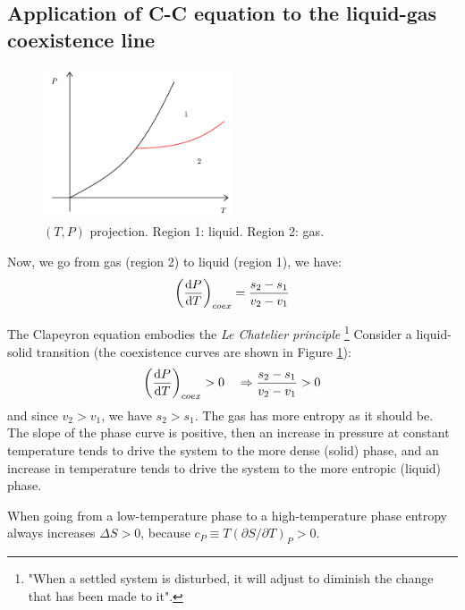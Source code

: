 \documentclass[../main/main.tex]{subfiles}
\begin{document}
\subsection{Application of C-C equation to the liquid-gas coexistence line}
\begin{figure}[h!]
\centering
\includegraphics[width=0.5\textwidth]{../lessons/3_image/16.pdf}
\caption{\label{fig:3_16} \( (T,P) \) projection. Region 1: liquid. Region 2: gas. }
\end{figure}

 Now, we go from gas (region 2) to liquid (region 1), we have:
\begin{equation}
  \qty(\dv{P}{T} )_{coex} = \frac{s_2 - s_1}{v_2 - v_1}
  \label{eq:}
\end{equation}

The Clapeyron equation embodies the \emph{Le Chatelier principle} \footnote{"When a settled system is disturbed, it will adjust to diminish the change that has been made to it".}
 Consider a liquid-solid transition (the coexistence curves are shown in Figure \ref{fig:3_16}):
\begin{equation}
  \qty(\dv{P}{T} )_{coex} > 0 \quad \Rightarrow \frac{s_2 - s_1}{v_2 - v_1} > 0
\end{equation}
and since \( v_2 > v_1 \), we have \( s_2 > s_1 \). The gas has more entropy as it should be.  The slope of the phase curve is positive, then an increase in pressure at constant temperature tends to drive the system to the more dense (solid) phase, and an increase in temperature tends to drive the system to the more entropic (liquid) phase.


When going from a low-temperature phase to a high-temperature phase entropy always increases \( \Delta S > 0 \), because \( c_P \equiv T (\partial{S}/\partial{T}  )_P > 0 \).
\end{document}
